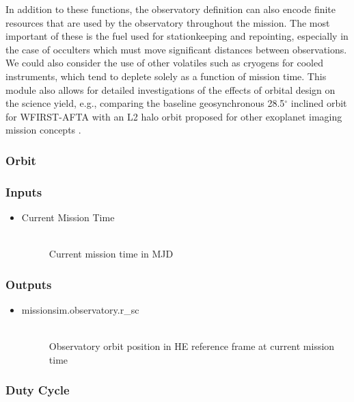 \documentclass[]{asme2ej}
\begin{document}
In addition to these functions, the observatory definition can also encode finite resources that are used by the observatory throughout the mission.  The most important of these is the fuel used for stationkeeping and repointing, especially in the case of occulters which must move significant distances between observations.  We could also consider the use of other volatiles such as cryogens for cooled instruments, which tend to deplete solely as a function of mission time.  This module also allows for detailed investigations of the effects of orbital design on the science yield, e.g., comparing the baseline geosynchronous 28.5$^{\circ}$ inclined orbit for WFIRST-AFTA  \citep{Spergel2013} with an L2 halo orbit proposed for other exoplanet imaging mission concepts  \citep{savransky2010occulting}. 

\subsubsection{Orbit}

\subsubsection*{Inputs}
\begin{itemize}
    \item
    \begin{description}
        \item[Current Mission Time] \hfill \\
        Current mission time in MJD
    \end{description}
\end{itemize}

\subsubsection*{Outputs}
\begin{itemize}
    \item
    \begin{description}
        \item[missionsim.observatory.r\_sc] \hfill \\
        Observatory orbit position in HE reference frame at current mission time
    \end{description}
\end{itemize}

\subsubsection{Duty Cycle}
\end{document}
